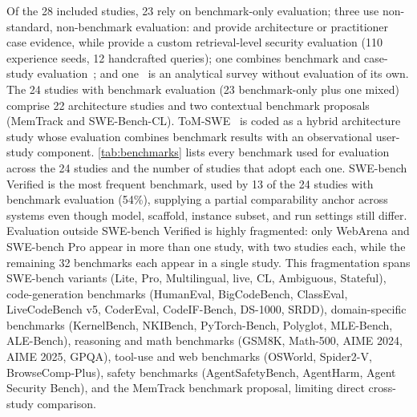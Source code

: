 Of the 28 included studies, 23 rely on benchmark-only evaluation;
three use non-standard, non-benchmark evaluation:
\citet{bui2026opendev} and \citet{vasilopoulos2026codified} provide
architecture or practitioner case evidence, while
\citet{srivastava2025memorygraft} provide a custom retrieval-level
security evaluation (110 experience seeds, 12 handcrafted queries);
one combines benchmark and case-study evaluation~\citep{zhou2025tomswe};
and one~\citep{du2026memory} is an analytical survey without evaluation
of its own.
The 24 studies with benchmark evaluation (23 benchmark-only plus one
mixed) comprise 22 architecture studies and two contextual benchmark
proposals (MemTrack and SWE-Bench-CL).
ToM-SWE~\citep{zhou2025tomswe} is coded as a hybrid architecture study
whose evaluation combines benchmark results with an observational
user-study component.
\autoref{tab:benchmarks} lists every benchmark used for evaluation
across the 24 studies and the number of studies that adopt each one.
SWE-bench Verified is the most frequent benchmark, used by 13 of the
24 studies with benchmark evaluation (54\%), supplying a partial
comparability anchor across systems even though model, scaffold,
instance subset, and run settings still differ.
Evaluation outside SWE-bench Verified is highly fragmented: only
WebArena and SWE-bench Pro appear in more than one study, with two
studies each, while the remaining 32 benchmarks each appear in a
single study.
This fragmentation spans SWE-bench variants (Lite, Pro, Multilingual,
live, CL, Ambiguous, Stateful), code-generation benchmarks
(HumanEval, BigCodeBench, ClassEval, LiveCodeBench v5, CoderEval,
CodeIF-Bench, DS-1000, SRDD), domain-specific benchmarks
(KernelBench, NKIBench, PyTorch-Bench, Polyglot, MLE-Bench,
ALE-Bench), reasoning and math benchmarks (GSM8K, Math-500, AIME
2024, AIME 2025, GPQA), tool-use and web benchmarks (OSWorld,
Spider2-V, BrowseComp-Plus), safety benchmarks (AgentSafetyBench,
AgentHarm, Agent Security Bench), and the MemTrack benchmark
proposal, limiting direct cross-study comparison.

